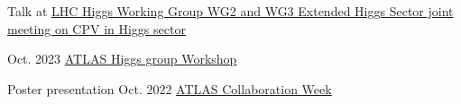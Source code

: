 \begin{cventries}

{}
{}
{}
{
    \begin{cvitems}
    \item Talk at \href{https://indico.cern.ch/event/1230456/\#5-simulation-based-inference-i}{LHC Higgs Working Group WG2 and WG3 Extended Higgs Sector joint meeting on CPV in Higgs sector}
    \end{cvitems}
}

\end{cventries}


\begin{cventries}

{}
{Oct. 2023}
{\href{https://indico.cern.ch/event/1280531/contributions/5559532/}{ATLAS Higgs group Workshop}}{}

{Poster presentation}
{Oct. 2022}
{\href{https://indico.cern.ch/event/1187086/\#37-the-atlas-jet-trigger-in-ru}{ATLAS Collaboration Week}}
{}

\end{cventries}


